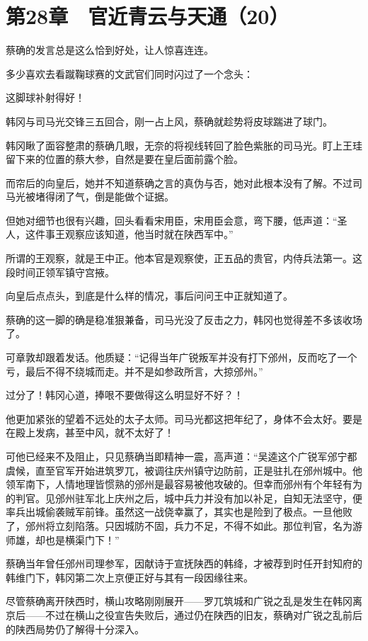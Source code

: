 \section{第28章　官近青云与天通（20）}

蔡确的发言总是这么恰到好处，让人惊喜连连。 

多少喜欢去看蹴鞠球赛的文武官们同时闪过了一个念头： 

这脚球补射得好！ 

韩冈与司马光交锋三五回合，刚一占上风，蔡确就趁势将皮球踹进了球门。 

韩冈瞅了面容整肃的蔡确几眼，无奈的将视线转回了脸色紫胀的司马光。盯上王珪留下来的位置的蔡大参，自然是要在皇后面前露个脸。 

而帘后的向皇后，她并不知道蔡确之言的真伪与否，她对此根本没有了解。不过司马光被堵得闭了气，倒是能做个证据。 

但她对细节也很有兴趣，回头看看宋用臣，宋用臣会意，弯下腰，低声道：“圣人，这件事王观察应该知道，他当时就在陕西军中。” 

所谓的王观察，就是王中正。他本官是观察使，正五品的贵官，内侍兵法第一。这段时间正领军镇守宫掖。 

向皇后点点头，到底是什么样的情况，事后问问王中正就知道了。 

蔡确的这一脚的确是稳准狠兼备，司马光没了反击之力，韩冈也觉得差不多该收场了。 

可章敦却跟着发话。他质疑：“记得当年广锐叛军并没有打下邠州，反而吃了一个亏，最后不得不绕城而走。并不是如参政所言，大掠邠州。” 

过分了！韩冈心道，捧哏不要做得这么明显好不好？！ 

他更加紧张的望着不远处的太子太师。司马光都这把年纪了，身体不会太好。要是在殿上发病，甚至中风，就不太好了！ 

可他已经来不及阻止，只见蔡确当即精神一震，高声道：“吴逵这个广锐军邠宁都虞候，直至官军开始进筑罗兀，被调往庆州镇守边防前，正是驻扎在邠州城中。他领军南下，人情地理皆惯熟的邠州是最容易被他攻破的。但幸而邠州有个年轻有为的判官。见邠州驻军北上庆州之后，城中兵力并没有加以补足，自知无法坚守，便率兵出城偷袭贼军前锋。虽然这一战侥幸赢了，其实也是险到了极点。一旦他败了，邠州将立刻陷落。只因城防不固，兵力不足，不得不如此。那位判官，名为游师雄，却也是横渠门下！” 

蔡确当年曾任邠州司理参军，因献诗于宣抚陕西的韩绛，才被荐到时任开封知府的韩维门下，韩冈第二次上京便正好与其有一段因缘往来。 

尽管蔡确离开陕西时，横山攻略刚刚展开——罗兀筑城和广锐之乱是发生在韩冈离京后——不过在横山之役宣告失败后，通过仍在陕西的旧友，蔡确对广锐之乱前后的陕西局势仍了解得十分深入。 

